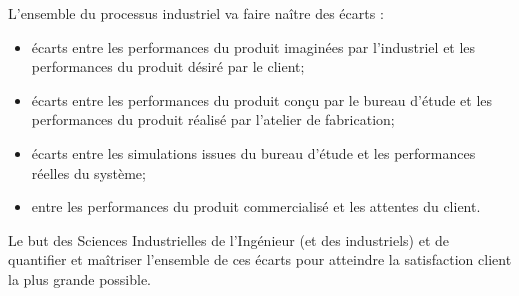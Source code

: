 \documentclass[11pt,oneside]{article}
\begin{document}
L'ensemble du processus industriel va faire naître des écarts : 
\begin{itemize}
\item écarts entre les performances du produit imaginées par l'industriel et les performances du produit désiré par le client;
\item écarts entre les performances du produit conçu par le bureau d'étude et les performances du produit réalisé par l'atelier de fabrication;
\item écarts entre les simulations issues du bureau d'étude et les performances réelles du système;
\item entre les performances du produit commercialisé et les attentes du client.
\end{itemize}

Le but des Sciences Industrielles de l'Ingénieur (et des industriels) et de quantifier et maîtriser l'ensemble de ces écarts pour atteindre la satisfaction client la plus grande possible. 
\end{document}
